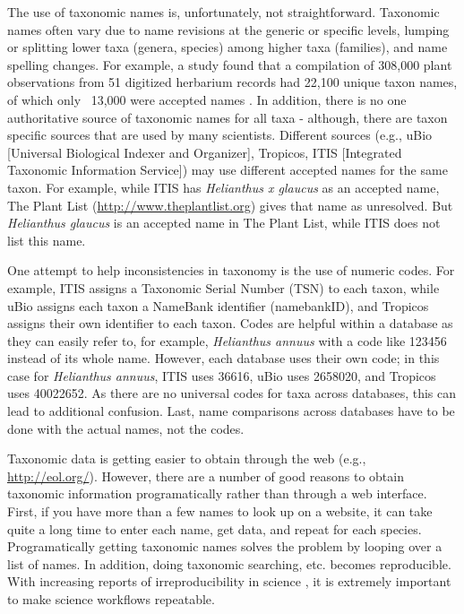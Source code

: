 \documentclass[10pt,a4paper,twocolumn]{article}\usepackage[]{graphicx}\usepackage[]{color}
\begin{document}
The use of taxonomic names is, unfortunately, not straightforward. Taxonomic names often vary due to name revisions at the generic or specific levels, lumping or splitting lower taxa (genera, species) among higher taxa (families), and name spelling changes. For example, a study found that a compilation of 308,000 plant observations from 51 digitized herbarium records had 22,100 unique taxon names, of which only ~13,000 were accepted names \cite{weiser2007,boyle2013}. In addition, there is no one authoritative source of taxonomic names for all taxa - although, there are taxon specific sources that are used by many scientists. Different sources (e.g., uBio [Universal Biological Indexer and Organizer], Tropicos, ITIS [Integrated Taxonomic Information Service]) may use different accepted names for the same taxon. For example, while ITIS has \emph{Helianthus x glaucus} as an accepted name, The Plant List (\url{http://www.theplantlist.org}) gives that name as unresolved. But \emph{Helianthus glaucus} is an accepted name in The Plant List, while ITIS does not list this name. 

One attempt to help inconsistencies in taxonomy is the use of numeric codes. For example, ITIS assigns a Taxonomic Serial Number (TSN) to each taxon, while uBio assigns each taxon a NameBank identifier (namebankID), and Tropicos assigns their own identifier to each taxon. Codes are helpful within a database as they can easily refer to, for example, \emph{Helianthus annuus} with a code like 123456 instead of its whole name. However, each database uses their own code; in this case for \emph{Helianthus annuus}, ITIS uses 36616, uBio uses 2658020, and Tropicos uses 40022652. As there are no universal codes for taxa across databases, this can lead to additional confusion. Last, name comparisons across databases have to be done with the actual names, not the codes. 

Taxonomic data is getting easier to obtain through the web (e.g., \url{http://eol.org/}). However, there are a number of good reasons to obtain taxonomic information programatically rather than through a web interface. First, if you have more than a few names to look up on a website, it can take quite a long time to enter each name, get data, and repeat for each species. Programatically getting taxonomic names solves the problem by looping over a list of names. In addition, doing taxonomic searching, etc. becomes reproducible. With increasing reports of irreproducibility in science \cite{stodden2010,zimmer2012}, it is extremely important to make science workflows repeatable.
\end{document}
